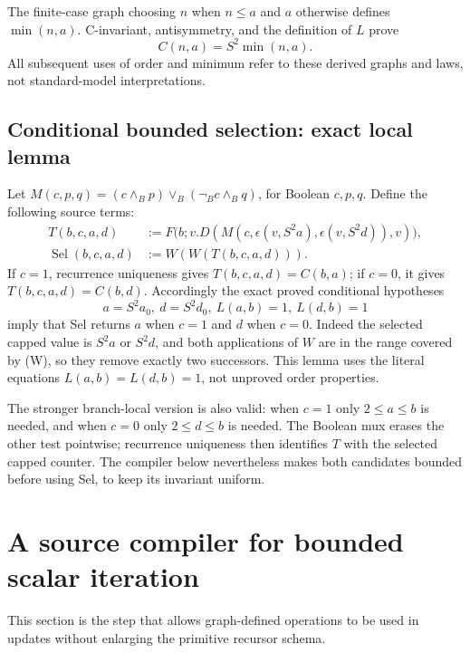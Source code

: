 The finite-case graph choosing $n$ when $n\le a$ and $a$ otherwise
defines $\min(n,a)$. C-invariant, antisymmetry, and the definition
of $L$ prove
\[
                          C(n,a)=S^2\min(n,a).
\tag{C-min}
\]
All subsequent uses of order and minimum refer to these derived
graphs and laws, not standard-model interpretations.

\subsection{Conditional bounded selection: exact local lemma}
Let $M(c,p,q)=(c\wedge_Bp)\vee_B(\neg_Bc\wedge_Bq)$, for Boolean
$c,p,q$. Define the following source terms:
\[
\begin{split}
T(b,c,a,d)&:=F\bigl(b;v.D(M(c,\epsilon(v,S^2a),
                                  \epsilon(v,S^2d)),v)\bigr),\\
\operatorname{Sel}(b,c,a,d)&:=W(W(T(b,c,a,d))).
\end{split}
\]
If $c=1$, recurrence uniqueness gives $T(b,c,a,d)=C(b,a)$;
if $c=0$, it gives $T(b,c,a,d)=C(b,d)$. Accordingly the exact proved
conditional hypotheses
\[
 a=S^2a_0,\ d=S^2d_0,\ L(a,b)=1,\ L(d,b)=1
\]
imply that Sel returns $a$ when $c=1$ and $d$ when $c=0$.
Indeed the selected capped value is $S^2a$ or $S^2d$, and both
applications of $W$ are in the range covered by (W), so they remove
exactly two successors. This lemma uses the literal equations
$L(a,b)=L(d,b)=1$, not unproved order properties.

The stronger branch-local version is also valid: when $c=1$ only
$2\le a\le b$ is needed, and when $c=0$ only $2\le d\le b$ is
needed. The Boolean mux erases the other test pointwise; recurrence
uniqueness then identifies $T$ with the selected capped counter. The
compiler below nevertheless makes both candidates bounded before
using Sel, to keep its invariant uniform.

\section{A source compiler for bounded scalar iteration}
\label{sec:selfseed-bounded}
This section is the step that allows graph-defined operations to be
used in updates without enlarging the primitive recursor schema.

